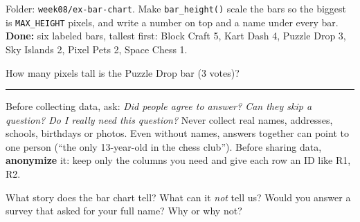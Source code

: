 \begin{exercise}
Folder: \texttt{week08/ex-bar-chart}. Make \texttt{bar\_height()} scale the bars so the biggest is \texttt{MAX\_HEIGHT} pixels, and write a number on top and a name under every bar. \textbf{Done:} six labeled bars, tallest first: Block Craft 5, Kart Dash 4, Puzzle Drop 3, Sky Islands 2, Pixel Pets 2, Space Chess 1.

How many pixels tall is the Puzzle Drop bar (3 votes)? \rule{2cm}{0.4pt}
\end{exercise}

\begin{safety}
Before collecting data, ask: \emph{Did people agree to answer? Can they skip a question? Do I really need this question?} Never collect real names, addresses, schools, birthdays or photos. Even without names, answers together can point to one person (\enquote{the only 13-year-old in the chess club}). Before sharing data, \textbf{anonymize} it: keep only the columns you need and give each row an ID like R1, R2.
\end{safety}

\begin{vocab}
\end{vocab}

\begin{reflection}
What story does the bar chart tell? What can it \emph{not} tell us?
Would you answer a survey that asked for your full name? Why or why not?
\end{reflection}
